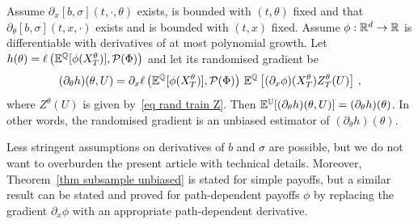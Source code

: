 \begin{theorem}
\label{thm subsample unbiased}
Assume $\partial_x [b,\sigma](t,\cdot,\theta)$ exists, is bounded with $(t,\theta)$ fixed and that $\partial_\theta [b,\sigma](t,x,\cdot)$ exists and is bounded with $(t,x)$ fixed. 
Assume $\phi:\mathbb{R}^d \to \mathbb{R}$ is differentiable with derivatives of at most polynomial growth.
Let
$
h(\theta)= \ell\left(\mathbb{E}^{\mathbb{Q}}[\phi(X_T^{\theta})], \mathcal{P}(\Phi)\right)
$
and let its randomised gradient be 
\[
(\partial_\theta h)(\theta,U) = \partial_x \ell  \left(\mathbb{E}^{\mathbb{Q}}[\phi(X_T^{\theta})] ,\mathcal{P}(\Phi)\right) \,\mathbb{E}^{ \mathbb{Q}}\left[(\partial_x\phi)( X_T^{\theta})Z_T^{\theta}(U) \right]\,,
\]
where $Z^\theta(U)$ is given by~\eqref{eq rand train Z}.
Then $\mathbb{E}^{\mathbb{U}}[(\partial_\theta h)(\theta,U)] = (\partial_\theta h)(\theta) $.
In other words, the randomised gradient is an unbiased estimator of $(\partial_\theta h)(\theta)$.
\end{theorem}
\begin{remark}
Less stringent assumptions on derivatives of $b$ and $\sigma$ are possible, but we do not want to overburden the present article with technical details.
Moreover, Theorem~\ref{thm subsample unbiased} is stated for simple payoffs, but a similar result can be stated and proved for path-dependent payoffs $\phi$ by replacing the gradient $\partial_x \phi$ with an appropriate path-dependent derivative.
\end{remark}
